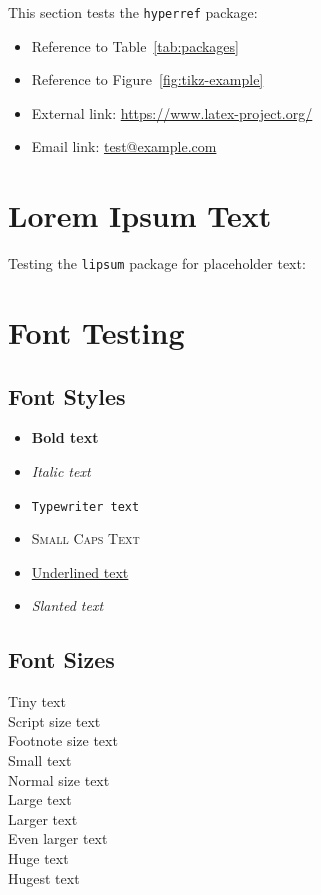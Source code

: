 \documentclass[12pt,a4paper]{article}
\begin{document}
This section tests the \texttt{hyperref} package:

\begin{itemize}
    \item Reference to Table~\ref{tab:packages}
    \item Reference to Figure~\ref{fig:tikz-example}
    \item External link: \url{https://www.latex-project.org/}
    \item Email link: \href{mailto:test@example.com}{test@example.com}
\end{itemize}

\section{Lorem Ipsum Text}

Testing the \texttt{lipsum} package for placeholder text:

\lipsum[1-2]

\section{Font Testing}

\subsection{Font Styles}

\begin{itemize}
    \item \textbf{Bold text}
    \item \textit{Italic text}
    \item \texttt{Typewriter text}
    \item \textsc{Small Caps Text}
    \item \underline{Underlined text}
    \item \textsl{Slanted text}
\end{itemize}

\subsection{Font Sizes}

{\tiny Tiny text} \\
{\scriptsize Script size text} \\
{\footnotesize Footnote size text} \\
{\small Small text} \\
{\normalsize Normal size text} \\
{\large Large text} \\
{\Large Larger text} \\
{\LARGE Even larger text} \\
{\huge Huge text} \\
{\Huge Hugest text}
\end{document}
